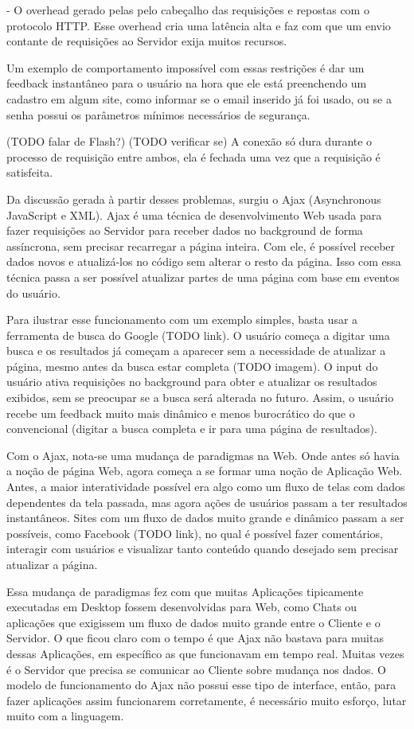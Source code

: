 \documentclass[a4paper,12pt]{article}
\begin{document}
- O overhead gerado pelas pelo cabeçalho das requisições e repostas com o protocolo HTTP. Esse overhead cria uma latência alta e faz com que um envio contante de requisições ao Servidor exija muitos recursos.

Um exemplo de comportamento impossível com essas restrições é dar um feedback instantâneo para o usuário na hora que ele está preenchendo um cadastro em algum site, como informar se o email inserido já foi usado, ou se a senha possui os parâmetros mínimos necessários de segurança.

(TODO falar de Flash?)
(TODO verificar se) A conexão só dura durante o processo de requisição entre ambos, ela é fechada uma vez que a requisição é satisfeita.

Da discussão gerada à partir desses problemas, surgiu o Ajax (Asynchronous JavaScript e XML). Ajax é uma técnica de desenvolvimento Web usada para fazer requisições ao Servidor para receber dados no background de forma assíncrona, sem precisar recarregar a página inteira. Com ele, é possível receber dados novos e atualizá-los no código sem alterar o resto da página. Isso com essa técnica passa a ser possível atualizar partes de uma página com base em eventos do usuário.

Para ilustrar esse funcionamento com um exemplo simples, basta usar a ferramenta de busca do Google (TODO link). O usuário começa a digitar uma busca e os resultados já começam a aparecer sem a necessidade de atualizar a página, mesmo antes da busca estar completa (TODO imagem). O input do usuário ativa requisições no background para obter e atualizar os resultados exibidos, sem se preocupar se a busca será alterada no futuro. Assim, o usuário recebe um feedback muito mais dinâmico e menos burocrático do que o convencional (digitar a busca completa e ir para uma página de resultados).

Com o Ajax, nota-se uma mudança de paradigmas na Web. Onde antes só havia a noção de página Web, agora começa a se formar uma noção de Aplicação Web. Antes, a maior interatividade possível era algo como um fluxo de telas com dados dependentes da tela passada, mas agora ações de usuários passam a ter resultados instantâneos. Sites com um fluxo de dados muito grande e dinâmico passam a ser possíveis, como Facebook (TODO link), no qual é possível fazer comentários, interagir com usuários e visualizar tanto conteúdo quando desejado sem precisar atualizar a página.

Essa mudança de paradigmas fez com que muitas Aplicações tipicamente executadas em Desktop fossem desenvolvidas para Web, como Chats ou aplicações que exigissem um fluxo de dados muito grande entre o Cliente e o Servidor. O que ficou claro com o tempo é que Ajax não bastava para muitas dessas Aplicações, em específico as que funcionavam em tempo real. Muitas vezes é o Servidor que precisa se comunicar ao Cliente sobre mudança nos dados. O modelo de funcionamento do Ajax não possui esse tipo de interface, então, para fazer aplicações assim funcionarem corretamente, é necessário muito esforço, lutar muito com a linguagem.
\end{document}
